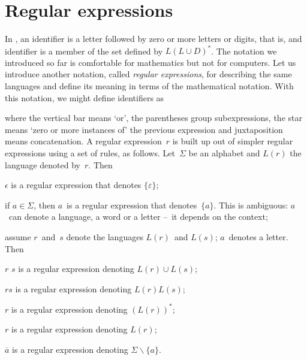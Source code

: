 \section{Regular expressions}

In \Pascal, an identifier is a letter followed by zero or more letters
or digits, that is, and identifier is a member of the set defined by
\(L(L \cup D)^{*}\). The notation we introduced so far is comfortable
for mathematics but not for computers. Let us introduce another
notation, called \emph{regular expressions}, for describing the same
languages and define its meaning in terms of the mathematical
notation. With this notation, we might define \Pascal identifiers as
\begin{center}
 \lparen{} \disj {}\rparen\kleene
\end{center}
where the vertical bar means `or', the parentheses group
subexpressions, the star means `zero or more instances of' the
previous expression and juxtaposition means concatenation. A regular
expression~\(r\) is built up out of simpler regular expressions using
a set of rules, as follows. Let~\(\Sigma\) be an alphabet and \(L(r)\)
the language denoted by~\(r\). Then
\begin{enumerate*}

   \item \(\epsilon\) is a regular expression that denotes
     \(\{\varepsilon\}\);\label{regexp_empty}

   \item if \(a \in \Sigma\), then \(a\)~is a regular expression that
     denotes~\(\{a\}\). This is ambiguous: \(a\)~can denote a
     language, a word or a letter --~it depends on the
     context; \label{regexp_sym}

   \item assume \(r\)~and~\(s\) denote the languages \(L(r)\)~and
     \(L(s)\); \(a\)~denotes a letter. Then \label{regexp_rec}
   \begin{enumerate*}

     \item \(r\) \disj \(s\) is a regular expression
     denoting \(L(r) \cup L(s)\);

     \item \(r s\) is a regular expression denoting \(L(r) L(s)\);

     \item \(r\)\kleene{} is a regular expression
     denoting \((L(r))^{*}\);

     \item \lparen\(r\)\rparen{} is a regular expression
     denoting \(L(r)\);

     \item \(\overline{a}\) is a regular expression denoting
       \(\Sigma\backslash \{a\}\).

   \end{enumerate*}

\end{enumerate*}
